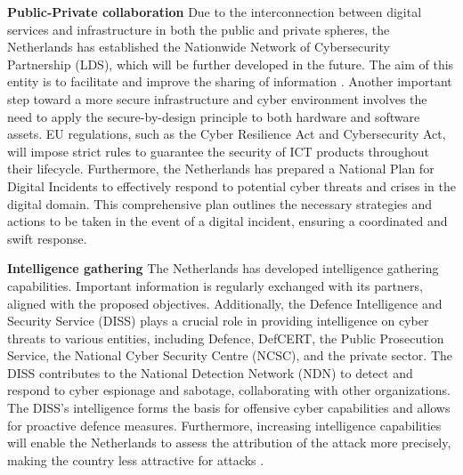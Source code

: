 \textbf{Public-Private collaboration} Due to the interconnection between digital services and infrastructure in both the public and private spheres, the Netherlands has established the Nationwide Network of Cybersecurity Partnership (LDS), which will be further developed in the future. The aim of this entity is to facilitate and improve the sharing of information \autocite{ministryofjusticeandsecurity_2022_netherlands}. Another important step toward a more secure infrastructure and cyber environment involves the need to apply the secure-by-design principle to both hardware and software assets. EU regulations, such as the Cyber Resilience Act and Cybersecurity Act, will impose strict rules to guarantee the security of ICT products throughout their lifecycle. Furthermore, the Netherlands has prepared a National Plan for Digital Incidents to effectively respond to potential cyber threats and crises in the digital domain. This comprehensive plan outlines the necessary strategies and actions to be taken in the event of a digital incident, ensuring a coordinated and swift response. 

\textbf{Intelligence gathering} The Netherlands has developed intelligence gathering capabilities. Important information is regularly exchanged with its partners, aligned with the proposed objectives. Additionally, the Defence Intelligence and Security Service (DISS) plays a crucial role in providing intelligence on cyber threats to various entities, including Defence, DefCERT, the Public Prosecution Service, the National Cyber Security Centre (NCSC), and the private sector. The DISS contributes to the National Detection Network (NDN) to detect and respond to cyber espionage and sabotage, collaborating with other organizations. The DISS's intelligence forms the basis for offensive cyber capabilities and allows for proactive defence measures. Furthermore, increasing intelligence capabilities will enable the Netherlands to assess the attribution of the attack more precisely, making the country less attractive for attacks \autocite{theinternationalinstituteforstrategicstudies_2023_cyber, ministryofdefence_2018_defence}.

